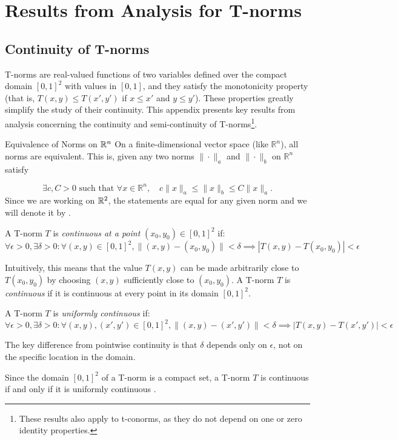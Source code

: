 \chapter{Results from Analysis for T-norms}

\section{Continuity of T-norms}
\label{app:cont_tnorms}
T-norms are real-valued functions of two variables defined over the compact domain $[0,1]^2$ with values in $[0,1]$, and they satisfy the monotonicity property (that is, $T(x,y) \le T(x',y')$ if $x \le x'$ and $y \le y'$). These properties greatly simplify the study of their continuity. This appendix presents key results from analysis concerning the continuity and semi-continuity of T-norms\footnote{These results also apply to t-conorms, as they do not depend on one or zero identity properties.}.

\begin{notation}{Equivalence of Norms on $\mathbb{R}^n$}
    On a finite-dimensional vector space (like $\mathbb{R}^n$), all norms are equivalent. This is, given any two norms $\|\cdot\|_a$ and $\|\cdot\|_b$ on $\mathbb{R}^n$ satisfy

 $$
 \exists c, C > 0 \text{ such that } \forall x \in \mathbb{R}^n, \quad c\|x\|_a \leq \|x\|_b \leq C\|x\|_a.
 $$
 Since we are working on $\mathbb{R}^2$, the statements are equal for any given norm and we will denote it by \say{$\|\cdot\|$}.
\end{notation}

\begin{definition}[Continuity]
A T-norm $T$ is \emph{continuous at a point} $(x_0, y_0) \in [0,1]^2$ if:
\[
\forall \epsilon > 0, \exists \delta > 0 : \forall (x,y) \in [0,1]^2, \|(x,y) - (x_0,y_0)\| < \delta \implies |T(x,y) - T(x_0,y_0)| < \epsilon
\]
\end{definition}

Intuitively, this means that the value $T(x,y)$ can be made arbitrarily close to $T(x_0,y_0)$ by choosing $(x,y)$ sufficiently close to $(x_0,y_0)$. A T-norm $T$ is \emph{continuous} if it is continuous at every point in its domain $[0,1]^2$.

\begin{definition}
A T-norm $T$ is \emph{uniformly continuous} if:
\[
\forall \epsilon > 0, \exists \delta > 0 : \forall (x,y),(x',y') \in [0,1]^2, \|(x,y) - (x',y')\| < \delta \implies |T(x,y) - T(x',y')| < \epsilon
\]
\end{definition}
The key difference from pointwise continuity is that $\delta$ depends only on $\epsilon$, not on the specific location in the domain.
\begin{remark}
    Since the domain $[0,1]^2$ of a T-norm is a compact set, a T-norm $T$ is continuous if and only if it is uniformly continuous \cite[p.~30]{Klement2000}.
\end{remark}

